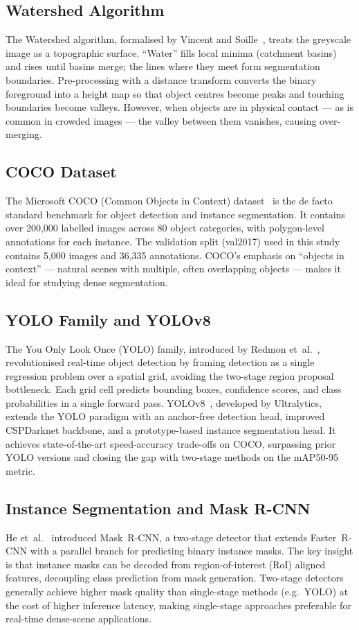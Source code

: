 \documentclass[12pt, a4paper]{article}
\begin{document}
\subsection{Watershed Algorithm}
The Watershed algorithm, formalised by Vincent and
Soille~\cite{vincent1991watershed}, treats the greyscale image as a
topographic surface.  ``Water'' fills local minima (catchment basins) and
rises until basins merge; the lines where they meet form segmentation
boundaries.  Pre-processing with a distance transform converts the binary
foreground into a height map so that object centres become peaks and touching
boundaries become valleys.  However, when objects are in physical contact —
as is common in crowded images — the valley between them vanishes, causing
over-merging.

\subsection{COCO Dataset}
The Microsoft COCO (Common Objects in Context) dataset~\cite{lin2014coco} is
the de facto standard benchmark for object detection and instance
segmentation.  It contains over 200,000 labelled images across 80 object
categories, with polygon-level annotations for each instance.  The
validation split (val2017) used in this study contains 5,000 images and
36,335 annotations.  COCO's emphasis on ``objects in context'' — natural
scenes with multiple, often overlapping objects — makes it ideal for
studying dense segmentation.

\subsection{YOLO Family and YOLOv8}
The You Only Look Once (YOLO) family, introduced by Redmon
et~al.~\cite{redmon2016yolo}, revolutionised real-time object detection by
framing detection as a single regression problem over a spatial grid, avoiding
the two-stage region proposal bottleneck.  Each grid cell predicts bounding
boxes, confidence scores, and class probabilities in a single forward pass.
YOLOv8~\cite{jocher2023yolov8}, developed by Ultralytics, extends the YOLO
paradigm with an anchor-free detection head, improved CSPDarknet backbone, and
a prototype-based instance segmentation head.  It achieves state-of-the-art
speed-accuracy trade-offs on COCO, surpassing prior YOLO versions and closing
the gap with two-stage methods on the mAP50-95 metric.

\subsection{Instance Segmentation and Mask R-CNN}
He et~al.~\cite{he2017maskrcnn} introduced Mask~R-CNN, a two-stage detector
that extends Faster~R-CNN with a parallel branch for predicting binary
instance masks.  The key insight is that instance masks can be decoded from
region-of-interest (RoI) aligned features, decoupling class prediction from
mask generation.  Two-stage detectors generally achieve higher mask quality
than single-stage methods (e.g.\ YOLO) at the cost of higher inference
latency, making single-stage approaches preferable for real-time dense-scene
applications.
\end{document}
